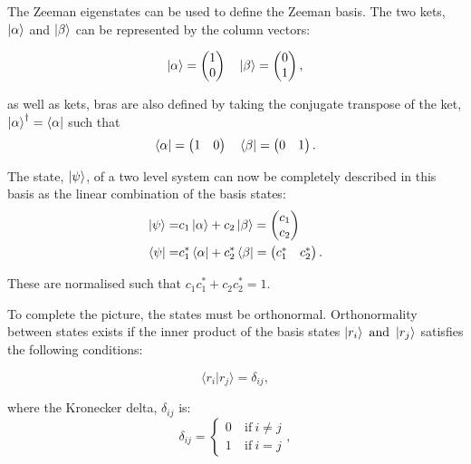 The Zeeman eigenstates can be used to define the Zeeman basis. The two kets, $\ket{\alpha}$ and $\ket{\beta}$ can be represented by the column vectors:

\begin{equation}
  \ket{\alpha} = \begin{pmatrix}
    1\\
    0
\end{pmatrix}\quad
 \ket{\beta} = \begin{pmatrix}
   0\\
   1
\end{pmatrix},
\end{equation}

as well as kets, bras are also defined by taking the conjugate transpose of the ket, $\ket{\alpha}^{\dagger} =
\bra{\alpha}$ such that
\begin{equation}
  \bra{\alpha} = \begin{pmatrix}
    1 & 0
\end{pmatrix}\quad
  \bra{\beta} = \begin{pmatrix}
  0 & 1
\end{pmatrix}.
\end{equation}

The state, $\ket{\psi}$, of a two level system can now be completely described in this basis
as the linear combination of the basis states:
\begin{align}\label{eqn:zeeman}
  \ket{\psi} =& c_1\ket{\alpha} + c_2\ket{\beta} = \begin{pmatrix}
    c_1\\
    c_2
\end{pmatrix}\\
  \bra{\psi} =& c_1^*\bra{\alpha} + c_2^*\bra{\beta} = \begin{pmatrix}
    c_1^* & c_2^*
\end{pmatrix}.
\end{align}

These are normalised such that $c_1c_1^* + c_2c_2^* = 1$.

To complete the picture, the states must be orthonormal. Orthonormality between states exists if the inner product
of the basis states $\ket{r_i} ~\text{and}~ \ket{r_j}$ satisfies the following conditions:

\begin{equation}
  \langle r_i\vert r_j\rangle = \delta_{ij},
\end{equation}

where the Kronecker delta, $\delta_{ij}$ is:
\begin{equation}
  \delta_{ij} = \begin{cases}
    0 & ~\text{if}~ i \ne j\\
    1 & ~\text{if}~ i = j
                \end{cases},
\end{equation}

